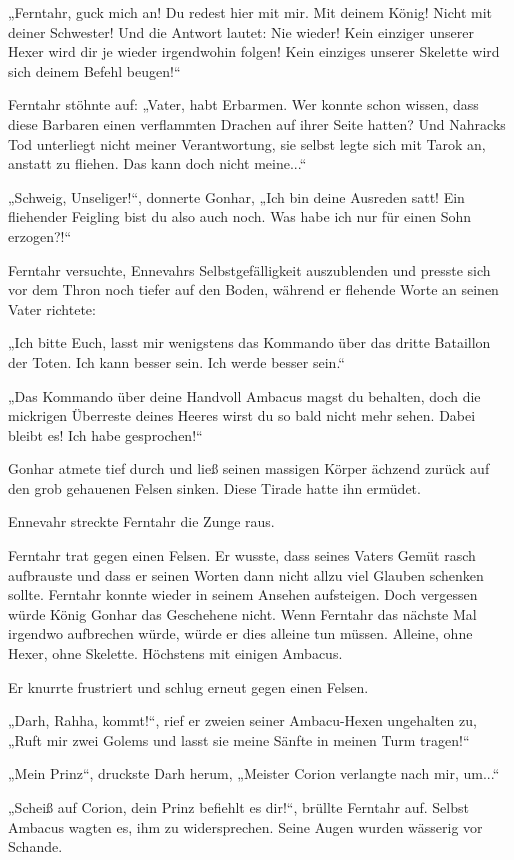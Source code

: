 „Ferntahr, guck mich an! Du redest hier mit mir. Mit deinem König! Nicht mit deiner Schwester! Und die Antwort lautet: Nie wieder! Kein einziger unserer Hexer wird dir je wieder irgendwohin folgen! Kein einziges unserer Skelette wird sich deinem Befehl beugen!“

Ferntahr stöhnte auf: „Vater, habt Erbarmen. Wer konnte schon wissen, dass diese Barbaren einen verflammten Drachen auf ihrer Seite hatten? Und Nahracks Tod unterliegt nicht meiner Verantwortung, sie selbst legte sich mit Tarok an, anstatt zu fliehen. Das kann doch nicht meine...“

„Schweig, Unseliger!“, donnerte Gonhar, „Ich bin deine Ausreden satt! Ein fliehender Feigling bist du also auch noch. Was habe ich nur für einen Sohn erzogen?!“

Ferntahr versuchte, Ennevahrs Selbstgefälligkeit auszublenden und presste sich vor dem Thron noch tiefer auf den Boden, während er flehende Worte an seinen Vater richtete:

„Ich bitte Euch, lasst mir wenigstens das Kommando über das dritte Bataillon der Toten. Ich kann besser sein. Ich werde besser sein.“

„Das Kommando über deine Handvoll Ambacus magst du behalten, doch die mickrigen Überreste deines Heeres wirst du so bald nicht mehr sehen. Dabei bleibt es! Ich habe gesprochen!“

Gonhar atmete tief durch und ließ seinen massigen Körper ächzend zurück auf den grob gehauenen Felsen sinken. Diese Tirade hatte ihn ermüdet.

Ennevahr streckte Ferntahr die Zunge raus.

Ferntahr trat gegen einen Felsen. Er wusste, dass seines Vaters Gemüt rasch aufbrauste und dass er seinen Worten dann nicht allzu viel Glauben schenken sollte. Ferntahr konnte wieder in seinem Ansehen aufsteigen. Doch vergessen würde König Gonhar das Geschehene nicht. Wenn Ferntahr das nächste Mal irgendwo aufbrechen würde, würde er dies alleine tun müssen. Alleine, ohne Hexer, ohne Skelette. Höchstens mit einigen Ambacus.

Er knurrte frustriert und schlug erneut gegen einen Felsen.

„Darh, Rahha, kommt!“, rief er zweien seiner Ambacu-Hexen ungehalten zu, „Ruft mir zwei Golems und lasst sie meine Sänfte in meinen Turm tragen!“

„Mein Prinz“, druckste Darh herum, „Meister Corion verlangte nach mir, um...“

„Scheiß auf Corion, dein Prinz befiehlt es dir!“, brüllte Ferntahr auf. Selbst Ambacus wagten es, ihm zu widersprechen. Seine Augen wurden wässerig vor Schande.

